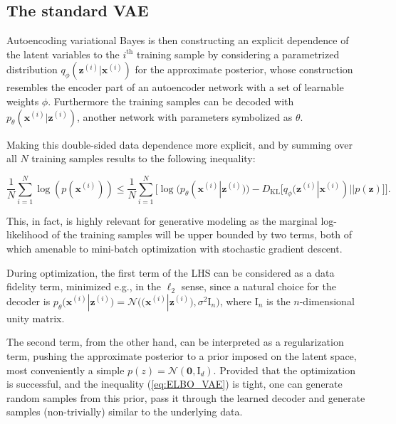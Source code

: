 \documentclass{article}
\begin{document}
\subsection{The standard VAE} \label{subsec:Vanilla_VAE}

Autoencoding variational Bayes \cite{VAE} is then constructing an explicit dependence of the latent variables to the $i^{\text{th}}$ training sample by considering a parametrized distribution $q_{\phi}(\mathbf{z}^{(i)}|\mathbf{x}^{(i)})$ for the approximate posterior, whose construction resembles the encoder part of an autoencoder network with a set of learnable weights $\phi$. Furthermore the training samples can be decoded with $p_{\theta}(\mathbf{x}^{(i)} | \mathbf{z}^{(i)})$, another network with parameters symbolized as $\theta$.

Making this double-sided data dependence more explicit, and by summing over all $N$ training samples results to the following inequality:


\begin{equation} \label{eq:vae_ELBO}
\frac{1}{N}\sum_{i=1}^N \log(p(\mathbf{x}^{(i)})) \leqslant \frac{1}{N} \sum_{i=1}^N \Big[ \log(p_{\theta}(\mathbf{x}^{(i)}|\mathbf{z}^{(i)}))   -  D_{\text{KL}}\big[ q_{\phi}(\mathbf{z}^{(i)}  | \mathbf{x}^{(i)}) || p(\mathbf{z}) \big] \Big].
\end{equation}

This, in fact, is highly relevant for generative modeling as the marginal log-likelihood of the training samples will be upper bounded by two terms, both of which amenable to mini-batch optimization with stochastic gradient descent. 

During optimization, the first term of the LHS can be considered as a data fidelity term, minimized e.g., in the $\ell_2$ sense, since a natural choice for the decoder is $p_{\theta}(\mathbf{x}^{(i)}|\mathbf{z}^{(i)}) = \mathcal{N} \Big( \big( \mathbf{x}^{(i)}|\mathbf{z}^{(i)} \big) , \sigma^2 \mathrm{I}_n \Big)$, where $\mathrm{I}_n$ is the $n$-dimensional unity matrix.

The second term, from the other hand, can be interpreted as a regularization term, pushing the approximate posterior to a prior imposed on the latent space, most conveniently a simple $p(z) = \mathcal{N}(\mathbf{0}, \mathrm{I}_d)$. Provided that the optimization is successful, and the inequality (\ref{eq:ELBO_VAE}) is tight, one can generate random samples from this prior, pass it through the learned decoder and generate samples (non-trivially) similar to the underlying data.   
\end{document}

